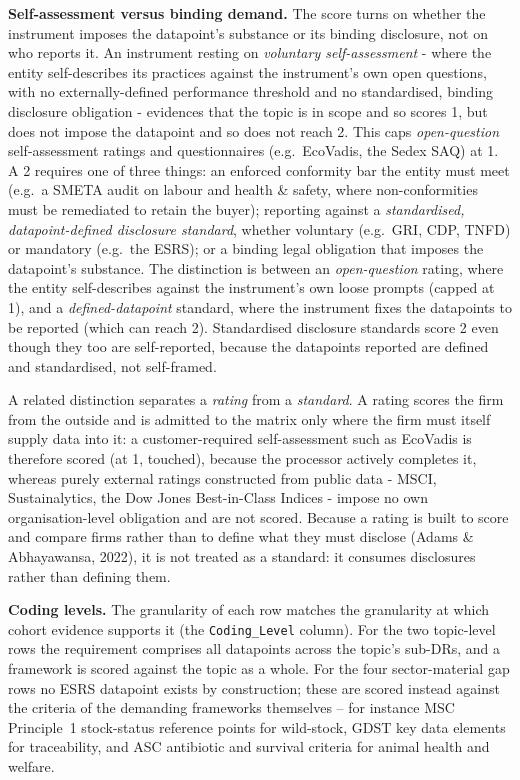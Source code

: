 \documentclass[
]{article}
\begin{document}
\textbf{Self-assessment versus binding demand.} The score turns on whether
the instrument imposes the datapoint's substance or its binding
disclosure, not on who reports it. An instrument resting on
\emph{voluntary self-assessment} - where the entity self-describes its
practices against the instrument's own open questions, with no
externally-defined performance threshold and no standardised, binding
disclosure obligation - evidences that the topic is in scope and so
scores 1, but does not impose the datapoint and so does not reach 2. This
caps \emph{open-question} self-assessment ratings and questionnaires
(e.g.\ EcoVadis, the Sedex SAQ) at 1. A 2 requires one of three things:
an enforced conformity bar the entity must meet (e.g.\ a SMETA audit on
labour and health \& safety, where non-conformities must be remediated to
retain the buyer); reporting against a \emph{standardised,
datapoint-defined disclosure standard}, whether voluntary (e.g.\ GRI,
CDP, TNFD) or mandatory (e.g.\ the ESRS); or a binding legal obligation
that imposes the datapoint's substance. The distinction is between an
\emph{open-question} rating, where the entity self-describes against the
instrument's own loose prompts (capped at 1), and a \emph{defined-datapoint}
standard, where the instrument fixes the datapoints to be reported (which
can reach 2). Standardised disclosure standards score 2 even though they
too are self-reported, because the datapoints reported are defined and
standardised, not self-framed.

A related distinction separates a \emph{rating} from a \emph{standard}. A
rating scores the firm from the outside and is admitted to the matrix only
where the firm must itself supply data into it: a customer-required
self-assessment such as EcoVadis is therefore scored (at 1, touched),
because the processor actively completes it, whereas purely external
ratings constructed from public data - MSCI, Sustainalytics, the Dow
Jones Best-in-Class Indices - impose no own organisation-level obligation
and are not scored. Because a rating is built to score and compare firms
rather than to define what they must disclose (Adams \& Abhayawansa,
2022), it is not treated as a standard: it consumes disclosures rather
than defining them.

\textbf{Coding levels.} The granularity of each row matches the
granularity at which cohort evidence supports it (the \texttt{Coding\_Level}
column). For the two topic-level rows the requirement comprises all
datapoints across the topic's sub-DRs, and a framework is scored against
the topic as a whole. For the four sector-material gap rows no ESRS
datapoint exists by construction; these are scored instead against the
criteria of the demanding frameworks themselves -- for instance MSC
Principle~1 stock-status reference points for wild-stock, GDST key data
elements for traceability, and ASC antibiotic and survival criteria for
animal health and welfare.
\end{document}

